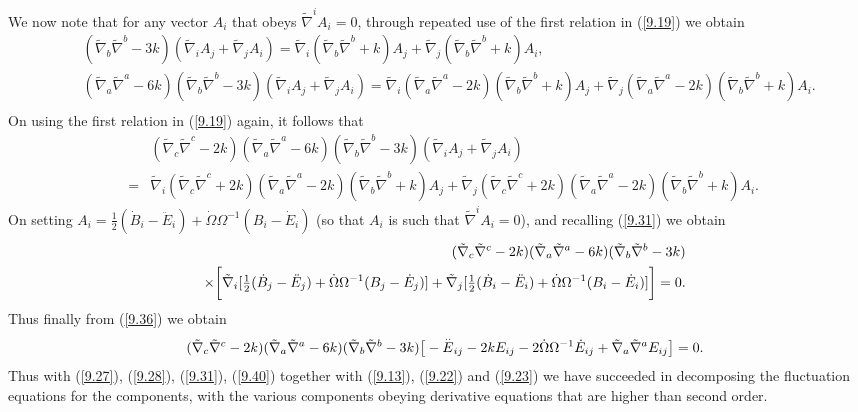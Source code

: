 \documentclass[aps,onecolumn,10pt]{revtex4}
\numberwithin{equation}{section}
\numberwithin{equation}{section}
\begin{document}
%
We now note that for any vector $A_i$ that obeys $\tilde{\nabla}^iA_i=0$, through repeated use of the first relation in (\ref{9.19}) we obtain 
%
\begin{eqnarray}
&&(\tilde{\nabla}_b\tilde{\nabla}^b-3k)(\tilde{\nabla}_iA_j+\tilde{\nabla}_jA_i)=
\tilde{\nabla}_i(\tilde{\nabla}_b\tilde{\nabla}^b+k)A_j+
\tilde{\nabla}_j(\tilde{\nabla}_b\tilde{\nabla}^b+k)A_i,
\nonumber\\
&&(\tilde{\nabla}_a\tilde{\nabla}^a-6k)(\tilde{\nabla}_b\tilde{\nabla}^b-3k)(\tilde{\nabla}_iA_j+\tilde{\nabla}_jA_i)
=\tilde{\nabla}_i(\tilde{\nabla}_a\tilde{\nabla}^a-2k)(\tilde{\nabla}_b\tilde{\nabla}^b+k)A_j+
\tilde{\nabla}_j(\tilde{\nabla}_a\tilde{\nabla}^a-2k)(\tilde{\nabla}_b\tilde{\nabla}^b+k)A_i.
\nonumber\\
\label{9.37}
\end{eqnarray}
%
On using the first relation in (\ref{9.19}) again,  it follows that 
%
\begin{eqnarray}
&&(\tilde{\nabla}_c\tilde{\nabla}^c-2k)(\tilde{\nabla}_a\tilde{\nabla}^a-6k)(\tilde{\nabla}_b\tilde{\nabla}^b-3k)(\tilde{\nabla}_iA_j+\tilde{\nabla}_jA_i)
\nonumber\\
&=&\tilde{\nabla}_i(\tilde{\nabla}_c\tilde{\nabla}^c+2k)(\tilde{\nabla}_a\tilde{\nabla}^a-2k)(\tilde{\nabla}_b\tilde{\nabla}^b+k)A_j+
\tilde{\nabla}_j(\tilde{\nabla}_c\tilde{\nabla}^c+2k)(\tilde{\nabla}_a\tilde{\nabla}^a-2k)(\tilde{\nabla}_b\tilde{\nabla}^b+k)A_i.
\label{9.38}
\end{eqnarray}
%
On setting $A_i=\tfrac{1}{2}(\dot{B}_i-\ddot{E}_i)+\dot{\Omega}\Omega^{-1}(B_i-\dot{E}_i)$ (so that $A_i$ is such that $\tilde{\nabla}^iA_i=0$), and recalling (\ref{9.31}) we obtain
%
\begin{eqnarray}
&&(\tilde{\nabla}_c\tilde{\nabla}^c-2k)(\tilde{\nabla}_a\tilde{\nabla}^a-6k)(\tilde{\nabla}_b\tilde{\nabla}^b-3k)
\nonumber\\
&&\times\bigg{[}
\tilde{\nabla}_i[\tfrac{1}{2}(\dot{B}_j-\ddot{E}_j)+\dot{\Omega}\Omega^{-1}(B_j-\dot{E}_j)]+\tilde{\nabla}_j[\tfrac{1}{2}(\dot{B}_i-\ddot{E}_i)+\dot{\Omega}\Omega^{-1}(B_i-\dot{E}_i)]\bigg{]}=0.
\label{9.39}
\end{eqnarray}
%
Thus finally from (\ref{9.36}) we obtain
%
\begin{eqnarray}
&&(\tilde{\nabla}_c\tilde{\nabla}^c-2k)(\tilde{\nabla}_a\tilde{\nabla}^a-6k)(\tilde{\nabla}_b\tilde{\nabla}^b-3k)
\big{[}
- \overset{..}{E}_{ij} - 2 k E_{ij} - 2  \dot{\Omega} \Omega^{-1}\dot{E}_{ij} + \tilde{\nabla}_{a}\tilde{\nabla}^{a}E_{ij}\big{]}=0.
\label{9.40}
\end{eqnarray}
%
Thus with (\ref{9.27}), (\ref{9.28}), (\ref{9.31}), (\ref{9.40}) together with (\ref{9.13}), (\ref{9.22}) and (\ref{9.23}) we have succeeded in decomposing the fluctuation equations for the components, with the various components obeying derivative equations that are higher than second order.
\end{document}
